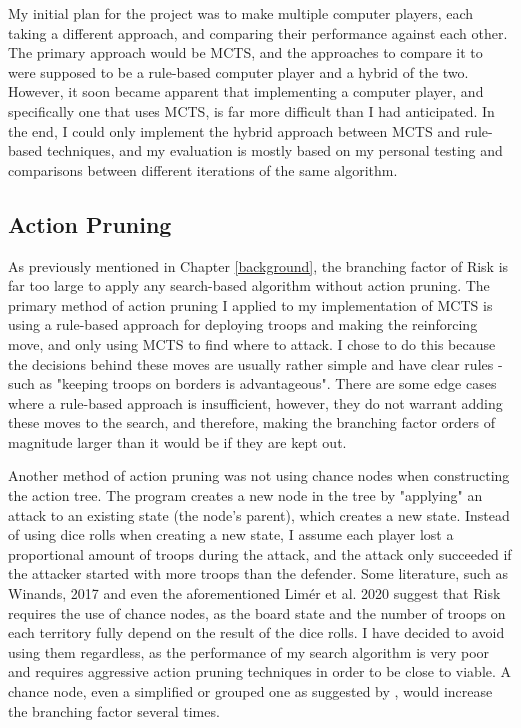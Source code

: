 My initial plan for the project was to make multiple computer players, each taking a different approach, and comparing their performance against each other. The primary approach would be MCTS, and the approaches to compare it to were supposed to be a rule-based computer player and a hybrid of the two. However, it soon became apparent that implementing a computer player, and specifically one that uses MCTS, is far more difficult than I had anticipated. In the end, I could only implement the hybrid approach between MCTS and rule-based techniques, and my evaluation is mostly based on my personal testing and comparisons between different iterations of the same algorithm.

\subsection{Action Pruning}
\label{actionPruning}

As previously mentioned in Chapter \ref{background}, the branching factor of Risk is far too large to apply any search-based algorithm without action pruning. The primary method of action pruning I applied to my implementation of MCTS is using a rule-based approach for deploying troops and making the reinforcing move, and only using MCTS to find where to attack. I chose to do this because the decisions behind these moves are usually rather simple and have clear rules - such as "keeping troops on borders is advantageous". There are some edge cases where a rule-based approach is insufficient, however, they do not warrant adding these moves to the search, and therefore, making the branching factor orders of magnitude larger than it would be if they are kept out.

Another method of action pruning was not using chance nodes when constructing the action tree. The program creates a new node in the tree by "applying" an attack to an existing state (the node's parent), which creates a new state. Instead of using dice rolls when creating a new state, I assume each player lost a proportional amount of troops during the attack, and the attack only succeeded if the attacker started with more troops than the defender. Some literature, such as Winands, 2017 \cite{winands2017monte} and even the aforementioned Lim{\'e}r et al. 2020 \cite{limer2020monte} suggest that Risk requires the use of chance nodes, as the board state and the number of troops on each territory fully depend on the result of the dice rolls. I have decided to avoid using them regardless, as the performance of my search algorithm is very poor and requires aggressive action pruning techniques in order to be close to viable. A chance node, even a simplified or grouped one as suggested by \cite{limer2020monte}, would increase the branching factor several times.

